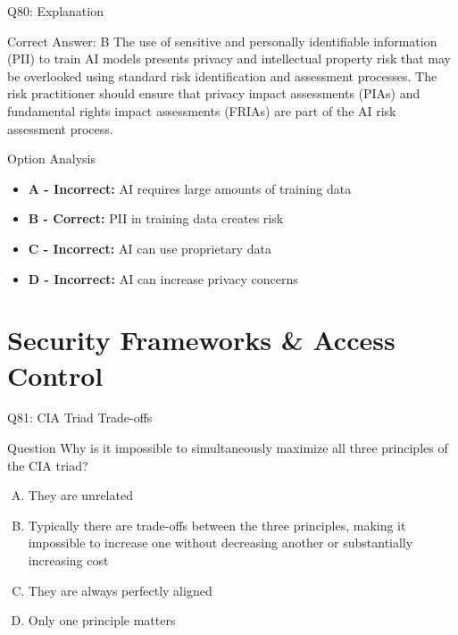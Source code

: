 \documentclass{beamer}
\begin{document}
	\begin{frame}{Q80: Explanation}
		\begin{block}{Correct Answer: B}
			The use of sensitive and personally identifiable information (PII) to train AI models presents privacy and intellectual property risk that may be overlooked using standard risk identification and assessment processes. The risk practitioner should ensure that privacy impact assessments (PIAs) and fundamental rights impact assessments (FRIAs) are part of the AI risk assessment process.
		\end{block}
		\begin{block}{Option Analysis}
			\begin{itemize}
				\item \textbf{A - Incorrect:} AI requires large amounts of training data
				\item \textbf{B - Correct:} PII in training data creates risk
				\item \textbf{C - Incorrect:} AI can use proprietary data
				\item \textbf{D - Incorrect:} AI can increase privacy concerns
			\end{itemize}
		\end{block}
	\end{frame}
	
	
	\section{Security Frameworks \& Access Control}
	
	\begin{frame}{Q81: CIA Triad Trade-offs}
		\begin{block}{Question}
			Why is it impossible to simultaneously maximize all three principles of the CIA triad?
		\end{block}
		\begin{enumerate}[(A)]
			\item They are unrelated
			\item Typically there are trade-offs between the three principles, making it impossible to increase one without decreasing another or substantially increasing cost
			\item They are always perfectly aligned
			\item Only one principle matters
		\end{enumerate}
	\end{frame}
	
\end{document}

